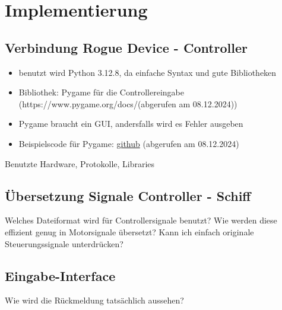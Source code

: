\chapter{Implementierung}

\section{Verbindung Rogue Device - Controller}
\begin{itemize}
    \item benutzt wird Python 3.12.8, da einfache Syntax und gute Bibliotheken
    \item Bibliothek: Pygame für die Controllereingabe (https://www.pygame.org/docs/(abgerufen am 08.12.2024))
    \item Pygame braucht ein GUI, andersfalls wird es Fehler ausgeben
    \item Beispielscode für Pygame: \href{https://github.com/kevinmcaleer/xbox_controller}{github} (abgerufen am 08.12.2024)
\end{itemize}


Benutzte Hardware, Protokolle, Libraries

\section{Übersetzung Signale Controller - Schiff}
Welches Dateiformat wird für Controllersignale benutzt?
Wie werden diese effizient genug in Motorsignale übersetzt?
Kann ich einfach originale Steuerungssignale unterdrücken?

\section{Eingabe-Interface}
Wie wird die Rückmeldung tatsächlich aussehen?